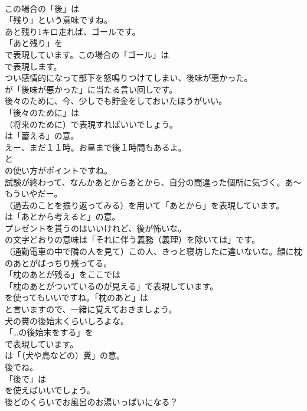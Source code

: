 \documentclass[8pt]{extreport}
\begin{document}
\begin{CJK}{UTF8}{min}
\\	この場合の「後」は
\\	「残り」という意味ですね。	
\\	あと残り1キロ走れば、ゴールです。 
\\	「あと残り」を 
\\	で表現しています。この場合の「ゴール」は 
\\	で表現します。	
\\	つい感情的になって部下を怒鳴りつけてしまい、後味が悪かった。 
\\	が「後味が悪かった」に当たる言い回しです。	
\\	後々のために、今、少しでも貯金をしておいたほうがいい。 
\\	「後々のために」は 
\\	（将来のために）で表現すればいいでしょう。
\\	は「蓄える」の意。	
\\	えー、まだ１１時。お昼まで後１時間もあるよ。 
\\	と
\\	の使い方がポイントですね。	
\\	試験が終わって、なんかあとからあとから、自分の間違った個所に気づく。あ～もういやだー。 
\\	（過去のことを振り返ってみる）を用いて「あとから」を表現しています。
\\	は「あとから考えると」の意。	
\\	プレゼントを貰うのはいいけれど、後が怖いな。 
\\	の文字どおりの意味は「それに伴う義務（義理）を除いては」です。	
\\	（通勤電車の中で隣の人を見て）この人、きっと寝坊したに違いないな。顔に枕のあとがばっちり残ってる。 
\\	「枕のあとが残る」をここでは
\\	「枕のあとがついているのが見える」で表現しています。
\\	を使ってもいいですね。「枕のあと」は
\\	と言いますので、一緒に覚えておきましょう。	
\\	犬の糞の後始末くらいしろよな。 
\\	「…の後始末をする」を 
\\	で表現しています。
\\	は「（犬や鳥などの）糞」の意。	
\\	後でね。 
\\	「後で」は
\\	を使えばいいでしょう。	
\\	後どのくらいでお風呂のお湯いっぱいになる？ 

\end{CJK}
\end{document}
